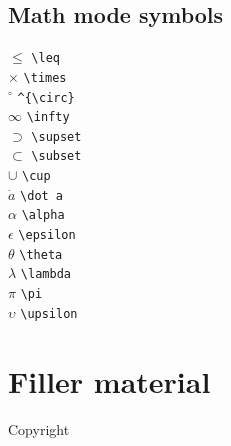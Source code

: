\documentclass[10pt]{article}
\begin{document}
\begin{multicols}{3}
\subsection{Math mode symbols}
\begin{multicols*}{4}
\( \leq \) \verb|\leq| \\
\( \times \) \verb|\times| \\
\( ^{\circ} \) \verb|^{\circ}| \\
\( \infty \) \verb|\infty| \\
\( \supset \) \verb|\supset| \\
\( \subset \) \verb|\subset| \\
\( \cup \) \verb|\cup| \\
\( \dot a \) \verb|\dot a| \\
\( \alpha \) \verb|\alpha| \\
\( \epsilon \) \verb|\epsilon| \\
\( \theta \) \verb|\theta| \\
\( \lambda \) \verb|\lambda| \\
\( \pi \) \verb|\pi| \\
\( \upsilon \) \verb|\upsilon|
\end{multicols*}

\section{Filler material}

\lipsum

\noindent Copyright \textcopyright{} \thedate{} \theauthor{}

\end{multicols}
\end{document}
